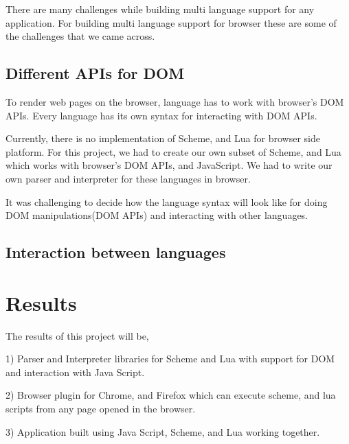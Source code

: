 There are many challenges while building multi language support for any application. For building multi language support for browser these are some of the challenges that we came across.

\subsection{Different APIs for DOM}

To render web pages on the browser, language has to work with browser's DOM APIs. Every language has its own syntax for interacting with DOM APIs. 


Currently, there is no implementation of Scheme, and Lua for browser side platform. For this project, we had to create our own subset of Scheme, and Lua which works with browser's DOM APIs, and JavaScript. We had to write our own parser and interpreter for these languages in browser.

It was challenging to decide how the language syntax will look like for doing DOM manipulations(DOM APIs) and interacting with other languages.



\subsection{Interaction between languages}




\section{Results}

The results of this project will be, 

1) Parser and Interpreter libraries for Scheme and Lua with support for DOM and interaction with Java Script.

2) Browser plugin for Chrome, and Firefox which can execute scheme, and lua scripts from any page opened in the browser.

3) Application built using Java Script, Scheme, and Lua working together.
